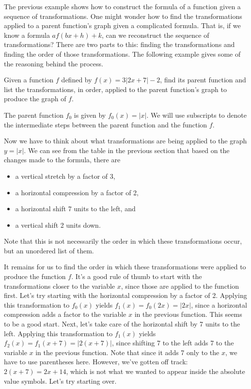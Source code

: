 \documentclass[handout, noauthor, nooutcomes]{ximera}
\begin{document}
The previous example shows how to construct the formula of a function given a sequence of transformations. One might wonder how to find the transformations applied to a parent function's graph given a complicated formula. That is, if we know a formula $af(bx + h) + k$, can we reconstruct the sequence of transformations? There are two parts to this: finding the transformations and finding the order of those transformations. The following example gives some of the reasoning behind the process. 

\begin{example}
Given a function $f$ defined by $f(x) = 3|2x + 7| - 2$, find its parent function and list the transformations, in order, applied to the parent function's graph to produce the graph of $f$. 
\begin{explanation}
The parent function $f_0$ is given by $f_0(x) = |x|$. We will use subscripts to denote the intermediate steps between the parent function and the function $f$. 

Now we have to think about what transformations are being applied to the graph $y = |x|$. We can see from the table in the previous section that based on the changes made to the formula, there are 
\begin{itemize}
\item a vertical stretch by a factor of 3,
\item a horizontal compression by a factor of 2,
\item a horizontal shift 7 units to the left, and
\item a vertical shift 2 units down.
\end{itemize}
Note that this is not necessarily the order in which these transformations occur, but an unordered list of them. 

It remains for us to find the order in which these transformations were applied to produce the function $f$. It's a good rule of thumb to start with the transformations closer to the variable $x$, since those are applied to the function first. Let's try starting with the horizontal compression by a factor of 2. Applying this transformation to $f_0(x)$ yields $f_1(x) = f_0(2x) = |2x|$, since a horizontal compression adds a factor to the variable $x$ in the previous function. This seems to be a good start. Next, let's take care of the horizontal shift by 7 units to the left. Applying this transformation to $f_1(x)$ yields $f_2(x) = f_1(x + 7) = |2(x + 7)|$, since shifting 7 to the left adds 7 to the variable $x$ in the previous function. Note that since it adds 7 only to the $x$, we have to use parentheses here. However, we've gotten off track: $2(x + 7) = 2x + 14$, which is not what we wanted to appear inside the absolute value symbols. Let's try starting over.


\end{explanation}
\end{example}
\end{document}
